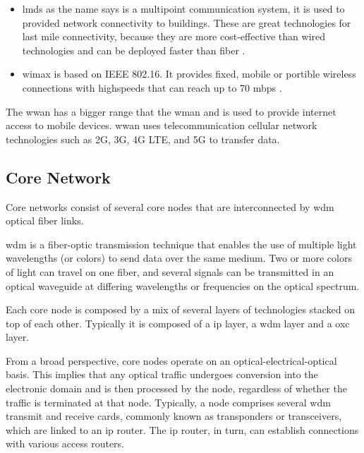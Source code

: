 \begin{itemize}

    \item \ac{lmds} as the name says is a multipoint communication system, it is used to provided network connectivity to buildings. These are great technologies for last mile connectivity, because they are more cost-effective than wired technologies and can be deployed faster than fiber \cite{forum:imda}.

    \item \ac{wimax}  is based on IEEE 802.16. It provides fixed, mobile or portible wireless connections with highspeeds that can reach up to 70 \ac{mbps} \cite{forum:ctrfantennasinc}.

\end{itemize}

The \ac{wwan} has a bigger range that the \ac{wman} and is used to provide internet access to mobile devices.
\ac{wwan} uses telecommunication cellular network technologies such as 2G, 3G, 4G LTE, and 5G to transfer data.


\subsection{Core Network}

Core networks consist of several core nodes that are interconnected by \ac{wdm} optical fiber links.

\ac{wdm} is a fiber-optic transmission technique that enables the use of multiple light wavelengths (or colors) to send data over the same medium. Two or more colors of light can travel on one fiber, and several signals can be transmitted in an optical waveguide at differing wavelengths or frequencies on the optical spectrum. 

Each core node is composed by a mix of several layers of technologies stacked on top of each other. Typically it is composed of a \ac{ip} layer, a \ac{wdm} layer and a \ac{oxc} layer.

From a broad perspective, core nodes operate on an optical-electrical-optical basis. This implies that any optical traffic undergoes conversion into the electronic domain and is then processed by the node, regardless of whether the traffic is terminated at that node. Typically, a node comprises several \ac{wdm} transmit and receive cards, commonly known as transponders or transceivers, which are linked to an \ac{ip} router. The \ac{ip} router, in turn, can establish connections with various access routers.

